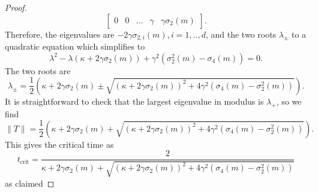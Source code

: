 \begin{proof}
\begin{equation}
\begin{bmatrix}
    0 & 0& \dots & \gamma & \gamma \sigma_2(m)
\end{bmatrix}.
   \end{equation} Therefore, the eigenvalues are $-2\gamma \sigma_{2,i}(m), i=1,..,d$, and the two roots  $\lambda_\pm$ to a quadratic equation which simplifies to \begin{equation}
       \lambda^2-\lambda(\kappa+2\gamma\sigma_2(m))+\gamma^2(\sigma_2^2(m)-\sigma_4(m))=0.
   \end{equation} The two roots are \begin{equation}
       \lambda_\pm=\frac{1}{2}\left(\kappa +2\gamma\sigma_2(m) \pm \sqrt{(\kappa+2\gamma\sigma_2(m))^2+4\gamma^2(\sigma_4(m)-\sigma_2^2(m))}\right).
   \end{equation} It is straightforward to check that the largest eigenvalue in modulus is $\lambda_+$, so we find \begin{equation}
       \|T\|=\frac{1}{2}\left(\kappa +2\gamma\sigma_2(m) + \sqrt{(\kappa+2\gamma\sigma_2(m))^2+4\gamma^2(\sigma_4(m)-\sigma_2^2(m))}\right).
   \end{equation} This gives the critical time as \begin{equation}
       t_\text{crit}= \frac{2}{\kappa +2\gamma\sigma_2(m) + \sqrt{(\kappa+2\gamma\sigma_2(m))^2+4\gamma^2(\sigma_4(m)-\sigma_2^2(m))}}
   \end{equation} as claimed\end{proof}

